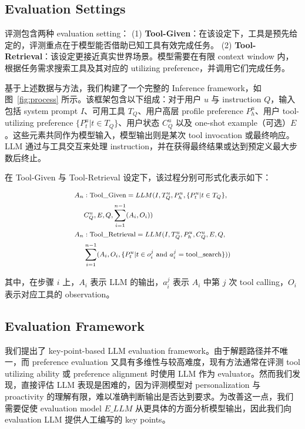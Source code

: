 \documentclass[11pt]{article}
\begin{document}
\subsection{Evaluation Settings}
评测包含两种 evaluation setting：
(1) \textbf{Tool-Given}：在该设定下，工具是预先给定的，评测重点在于模型能否借助已知工具有效完成任务。
(2) \textbf{Tool-Retrieval}：该设定更接近真实世界场景。模型需要在有限 context window 内，根据任务需求搜索工具及其对应的 utilizing preference，并调用它们完成任务。


基于上述数据与方法，我们构建了一个完整的 Inference framework，如图~\ref{fig:process} 所示。该框架包含以下组成：对于用户 $u$ 与 instruction $Q$，输入包括 system prompt $I$、可用工具 $T_Q$、用户高层 profile preference $P_h^u$、用户 tool-utilizing preference $\{P_t^u|t \in T_Q\}$、用户状态 $C_Q^u$ 以及 one-shot example（可选）$E$。这些元素共同作为模型输入，模型输出则是某次 tool invocation 或最终响应。LLM 通过与工具交互来处理 instruction，并在获得最终结果或达到预定义最大步数后终止。




在 Tool-Given 与 Tool-Retrieval 设定下，该过程分别可形式化表示如下：



\begin{equation}
\footnotesize
\begin{aligned}
    A_n&:\text{Tool\_Given} = LLM(I, T_Q^u, P_h^u, \{P_t^u|t \in T_Q\}, \\ &C_Q^u, E, Q, \sum_{i=1}^{n-1}(A_i, O_i))\\
    A_n&:\text{Tool\_Retrieval} = LLM(I, T_Q^u, P_h^u, C_Q^u, E, Q, \\ &\sum_{i=1}^{n-1}(A_i, O_i, \{P_t^u|t \in o_i^j \text{ and } a_i^j=\text{tool\_search}\}))
\end{aligned}
\end{equation}


其中，在步骤 $i$ 上，$A_i$ 表示 LLM 的输出，$a_i^j$ 表示 $A_i$ 中第 $j$ 次 tool calling，$O_i$ 表示对应工具的 observation。







\subsection{Evaluation Framework}
\label{sec:evaluation_framework}
我们提出了 key-point-based LLM evaluation framework。由于解题路径并不唯一，而 preference evaluation 又具有多维性与较高难度，现有方法通常在评测 tool utilizing ability \cite{DBLP:conf/iclr/QinLYZYLLCTQZHT24} 或 preference alignment \cite{zhao2025do} 时使用 LLM 作为 evaluator。然而我们发现，直接评估 LLM 表现是困难的，因为评测模型对 personalization 与 proactivity 的理解有限，难以准确判断输出是否达到要求。为改善这一点，我们需要促使 evaluation model $E\_LLM$ 从更具体的方面分析模型输出，因此我们向 evaluation LLM 提供人工编写的 key points。
\end{document}
